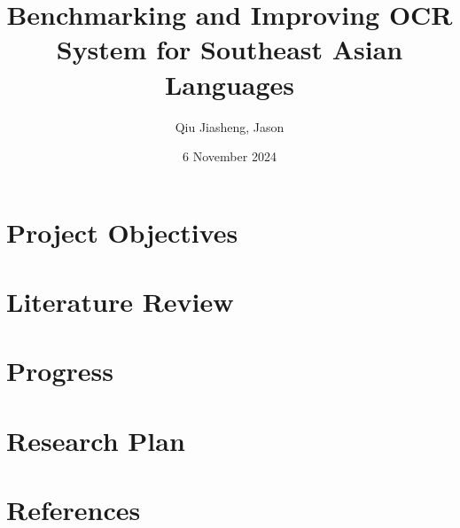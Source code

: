 \documentclass[12pt]{article}
\title{Benchmarking and Improving OCR System for Southeast Asian Languages}
\author{Qiu Jiasheng, Jason}
\date{6 November 2024}
\begin{document}
\pagestyle{plain}

\maketitle

\section{Project Objectives}
\lipsum[1]

\section{Literature Review}
\lipsum[1]

\section{Progress}
\lipsum[1]

\section{Research Plan}
\lipsum[1]

\section{References}
\lipsum[1]
\end{document}
